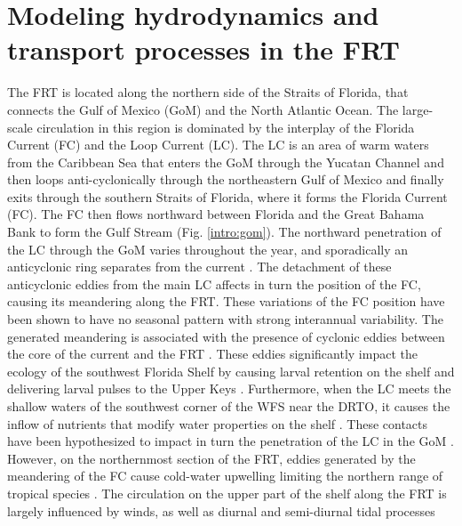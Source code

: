 \section{Modeling hydrodynamics and transport processes in the FRT}
The FRT is located along the northern side of the Straits of Florida, that connects the Gulf of Mexico (GoM) and the North Atlantic Ocean. The large-scale circulation in this region is dominated by the interplay of the Florida Current (FC) and the Loop Current (LC). The LC is an area of warm waters from the Caribbean Sea that enters the GoM through the Yucatan Channel and then loops anti-cyclonically through the northeastern Gulf of Mexico and finally exits through the southern Straits of Florida, where it forms the Florida Current (FC). The FC then flows northward between Florida and the Great Bahama Bank to form the Gulf Stream (Fig. \ref{intro:gom}). The northward penetration of the LC through the GoM varies throughout the year, and sporadically an anticyclonic ring separates from the current \citep{leipper1970sequence, maul1977annual, vukovich1988loop}. The detachment of these anticyclonic eddies from the main LC affects in turn the position of the FC, causing its meandering along the FRT. These variations of the FC position have been shown to have no seasonal pattern with strong interannual variability. The generated meandering is associated with the presence of cyclonic eddies between the core of the current and the FRT \citep{kourafalou2012florida}. These eddies significantly impact the ecology of the southwest Florida Shelf by causing larval retention on the shelf and delivering larval pulses to the Upper Keys \citep{lee1994evolution, sponaugle2005florida, kourafalou2012florida}. Furthermore, when the LC meets the shallow waters of the southwest corner of the WFS near the DRTO, it causes the inflow of nutrients that modify water properties on the shelf \citep{weisberg2003local, liu2016offshore}. These contacts have been hypothesized to impact in turn the penetration of the LC in the GoM \citep{weisberg2017loop}. However, on the northernmost section of the FRT, eddies generated by the meandering of the FC cause cold-water upwelling limiting the northern range of tropical species \citep{walker2013determining}. The circulation on the upper part of the shelf along the FRT is largely influenced by winds, as well as diurnal and semi-diurnal tidal processes \citep{lee2001transport, lee2002volume,d2007patterns}

